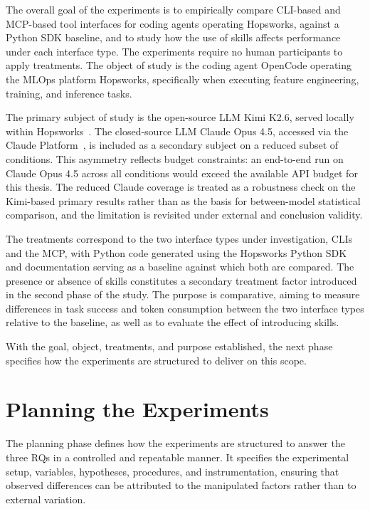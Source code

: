 \documentclass[
english,                 %
bibtex,                  %
includeExtraAbstracts, %
]{kththesis}
\numberwithin{listing}{chapter}
\begin{document}
The overall goal of the experiments is to empirically compare \gls{CLI}-based and \gls{MCP}-based tool interfaces for coding agents operating Hopsworks, against a Python \gls{SDK} baseline, and to study how the use of skills affects performance under each interface type. The experiments require no human participants to apply treatments. The object of study is the coding agent OpenCode operating the \gls{MLOps} platform Hopsworks, specifically when executing feature engineering, training, and inference tasks.

The primary subject of study is the open-source \gls{LLM} Kimi K2.6, served locally within Hopsworks~\cite{kimi_team_kimi_2026}. The closed-source \gls{LLM} Claude Opus 4.5, accessed via the Claude Platform~\cite{anthropic_pbc_introducing_2025}, is included as a secondary subject on a reduced subset of conditions. This asymmetry reflects budget constraints: an end-to-end run on Claude Opus 4.5 across all conditions would exceed the available \gls{API} budget for this thesis. The reduced Claude coverage is treated as a robustness check on the Kimi-based primary results rather than as the basis for between-model statistical comparison, and the limitation is revisited under external and conclusion validity.

The treatments correspond to the two interface types under investigation, \glspl{CLI} and the \gls{MCP}, with Python code generated using the Hopsworks Python \gls{SDK} and documentation serving as a baseline against which both are compared. The presence or absence of skills constitutes a secondary treatment factor introduced in the second phase of the study. The purpose is comparative, aiming to measure differences in task success and token consumption between the two interface types relative to the baseline, as well as to evaluate the effect of introducing skills.

With the goal, object, treatments, and purpose established, the next phase specifies how the experiments are structured to deliver on this scope.

\section{Planning the Experiments}

The planning phase defines how the experiments are structured to answer the three \glspl{RQ} in a controlled and repeatable manner. It specifies the experimental setup, variables, hypotheses, procedures, and instrumentation, ensuring that observed differences can be attributed to the manipulated factors rather than to external variation.
\end{document}
